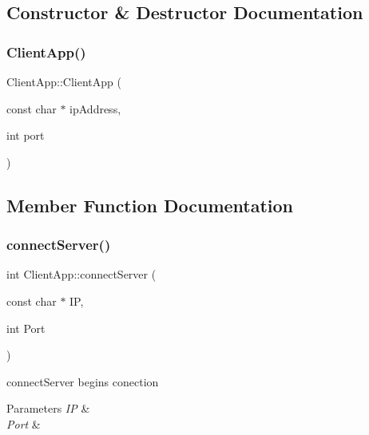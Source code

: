 \subsection{Constructor \& Destructor Documentation}
\mbox{\label{class_client_app_a424f2b5dedecd5e79b22434efe8763b7}} 
\subsubsection{\texorpdfstring{Client\+App()}{ClientApp()}}
{\footnotesize\ttfamily Client\+App\+::\+Client\+App (\begin{DoxyParamCaption}\item[{const char $\ast$}]{ip\+Address,  }\item[{int}]{port }\end{DoxyParamCaption})\hspace{0.3cm}{\ttfamily [inline]}}



\subsection{Member Function Documentation}
\mbox{\label{class_client_app_a642b604643ddf44666ae2a107790fa4f}} 
\subsubsection{\texorpdfstring{connect\+Server()}{connectServer()}}
{\footnotesize\ttfamily int Client\+App\+::connect\+Server (\begin{DoxyParamCaption}\item[{const char $\ast$}]{IP,  }\item[{int}]{Port }\end{DoxyParamCaption})\hspace{0.3cm}{\ttfamily [static]}}



connect\+Server begins conection 


\begin{DoxyParams}{Parameters}
{\em IP} & \\
\hline
{\em Port} & \\
\hline
\end{DoxyParams}
\mbox{\label{class_client_app_a16760d90c12ceee5ad146aa909d2fe76}} 
